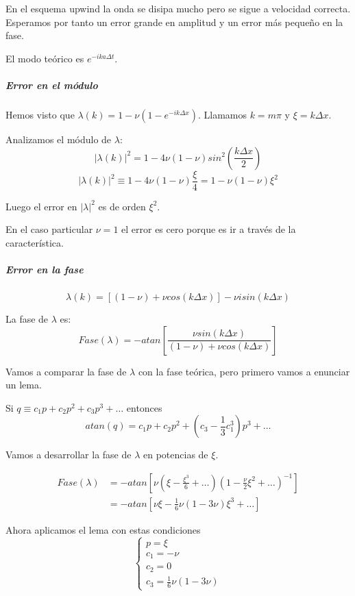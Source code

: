 En el esquema upwind la onda se disipa mucho pero se sigue a velocidad correcta. Esperamos por tanto un error grande en amplitud y un error más pequeño en la fase.

El modo teórico es $e^{-ika\Delta t}$.

\subparagraph{Error en el módulo}
Hemos visto que $\lambda(k) = 1-\nu (1-e^{-ik\Delta x})$. Llamamos $k = m\pi$ y $\xi = k\Delta x$.

Analizamos el módulo de $\lambda$:
$$|\lambda(k)|^2 = 1-4\nu(1-\nu)sin^2\left(\frac{k\Delta x}{2}\right)$$
$$|\lambda(k)|^2 \equiv 1-4\nu(1-\nu)\frac{\xi}{4} = 1-\nu(1-\nu)\xi^2$$

Luego el error en $|\lambda|^2$ es de orden $\xi^2$.

En el caso particular $\nu=1$ el error es cero porque es ir a través de la característica.

\subparagraph{Error en la fase}
$$\lambda(k) = \left[(1-\nu)+\nu cos(k\Delta x)\right]-\nu i sin(k\Delta x)$$

La fase de $\lambda$ es:
$$Fase(\lambda) = -atan\left[\frac{\nu sin(k\Delta x)}{(1-\nu)+\nu cos(k\Delta x)}\right]$$

Vamos a comparar la fase de $\lambda$ con la fase teórica, pero primero vamos a enunciar un lema.

\begin{lemma}
	Si $q\equiv c_1 p + c_2 p^2 + c_3 p^3 + \hdots$ entonces
	$$atan(q) = c_1p+ c_2p^2 + (c_3-\frac{1}{3}c_1^3)p^3 + \hdots$$
\end{lemma}

Vamos a desarrollar la fase de $\lambda$ en potencias de $\xi$.

\begin{align*}
Fase(\lambda) &=  -atan\left[\nu(\xi-\frac{\xi^3}{6}+\hdots)(1-\frac{\nu}{2}\xi^2+\hdots)^{-1}\right]\\
&= -atan\left[\nu \xi -\frac{1}{6}\nu(1-3\nu)\xi^3+\hdots\right]
\end{align*}

Ahora aplicamos el lema con estas condiciones
\begin{equation*}
	\left\{
	\begin{array}{l}
		p = \xi\\
		c_1 = -\nu\\
		c_2 = 0\\
		c_3 = \frac{1}{6}\nu(1-3\nu)
	\end{array}
	\right.
\end{equation*}

